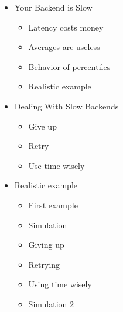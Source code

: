 \begin{itemize}
\item Your Backend is Slow
\begin{itemize}
\item Latency costs money
\item Averages are useless
\item Behavior of percentiles
\item Realistic example
\end{itemize}
\item Dealing With Slow Backends
\begin{itemize}
\item Give up
\item Retry
\item Use time wisely
\end{itemize}
\item Realistic example
\begin{itemize}
\item First example
\item Simulation
\item Giving up
\item Retrying
\item Using time wisely
\item Simulation 2
\end{itemize}
\end{itemize}


